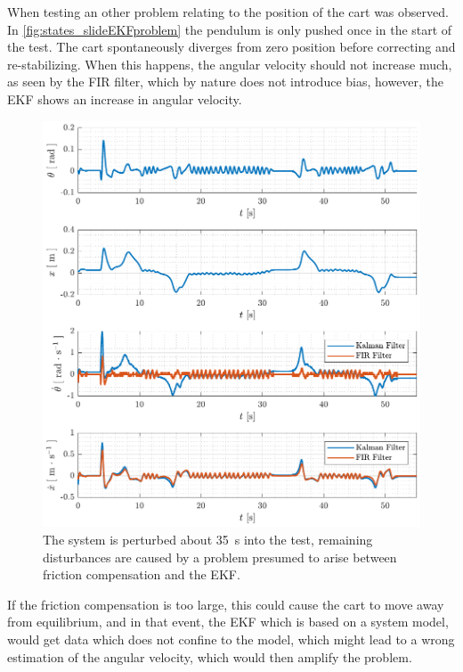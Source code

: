 %
When testing an other problem relating to the position of the cart was observed. In \autoref{fig:states_slideEKFproblem} the pendulum is only pushed once in the start of the test. The cart spontaneously diverges from zero position before correcting and re-stabilizing. When this happens, the angular velocity should not increase much, as seen by the FIR filter, which by nature does not introduce bias, however, the EKF shows an increase in angular velocity.
%
\begin{figure}[H]
  \includegraphics[width=.7\textwidth]{figures/states_slideEKFproblem}
  \caption{The system is perturbed about \SI{35}{s} into the test, remaining disturbances are caused by a problem presumed to arise between friction compensation and the EKF.}
  \label{fig:states_slideEKFproblem}
\end{figure}
If the friction compensation is too large, this could cause the cart to move away from equilibrium, and in that event, the EKF which is based on a system model, would get data which does not confine to the model, which might lead to a wrong estimation of the angular velocity, which would then amplify the problem.
%

